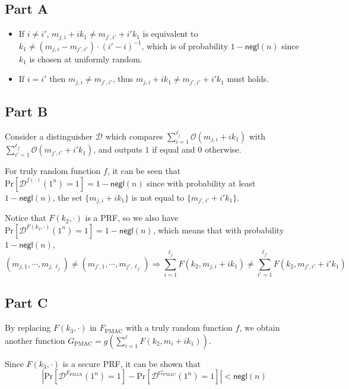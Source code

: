 \documentclass[8pt]{article}
\theoremstyle{compact}
\begin{document}
\subsection*{Part A}
\begin{itemize}
	\item If $i \neq i'$, $m_{j, i} + ik_1 \neq m_{j', i'} + i'k_1$ is equivalent to $k_1 \neq (m_{j, i} - m_{j', i'}) \cdot (i' - i)^{-1}$, which is of probability $1 - \textsf{negl}(n)$ since $k_1$ is chosen at uniformly random.
	\item If $i = i'$ then $m_{j,i} \neq m_{j',i'}$, thus $m_{j, i} + ik_1 \neq m_{j', i'} + i'k_1$ must holds.
\end{itemize}

\subsection*{Part B}
Consider a distinguisher $\mathcal D$ which compares $\sum\limits_{i=1}^{\ell_j}\mathcal O(m_{j,i} + ik_1)$ with $\sum\limits_{i'=1}^{\ell_{j'}}\mathcal O(m_{j',i'} + i'k_1)$, and outputs $1$ if equal and $0$ otherwise.

For truly random function $f$, it can be seen that $\text{Pr}[\mathcal D^{f(\cdot)}(1^n) = 1] = 1 - \textsf{negl}(n)$ since with probability at least $1 - \textsf{negl}(n)$, the set $\{m_{j, i} + ik_1\}$ is not equal to $\{m_{j', i'} + i'k_1\}$.

Notice that $F(k_2, \cdot)$ is a PRF, so we also have $\text{Pr}[\mathcal D^{F(k_2, \cdot)}(1^n) = 1] = 1 - \textsf{negl}(n)$, which means that with probability $1 - \textsf{negl}(n)$, $$(m_{j,1}, \cdots, m_{j,\ell_j}) \neq (m_{j',1}, \cdots, m_{j',\ell_{j'}}) \Rightarrow \sum\limits_{i=1}^{\ell_j}F(k_2, m_{j,i} + ik_1) \neq \sum\limits_{i'=1}^{\ell_{j'}}F(k_2, m_{j',i'} + i'k_1)$$

\subsection*{Part C}

By replacing $F(k_3, \cdot)$ in $F_{\text{PMAC}}$ with a truly random function $f$, we obtain another function $G_{\text{PMAC}} = g\left(\sum\limits_{i=1}^{\ell}F(k_2, m_i + ik_1)\right)$.

Since $F(k_3, \cdot)$ is a secure PRF, it can be shown that $$\left| \text{Pr}\left[\mathcal D^{F_{\text{PMAX}}}(1^n)=1\right] - \text{Pr}\left[\mathcal D^{G_{\text{PMAC}}}(1^n)=1\right] \right| < \textsf{negl}(n)$$
\end{document}
